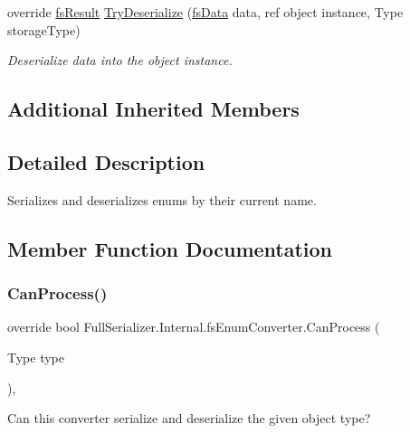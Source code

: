 \begin{DoxyCompactItemize}
override \hyperlink{struct_full_serializer_1_1fs_result}{fs\+Result} \hyperlink{class_full_serializer_1_1_internal_1_1fs_enum_converter_a083b9f0f694869aa476f0e6a333051da}{Try\+Deserialize} (\hyperlink{class_full_serializer_1_1fs_data}{fs\+Data} data, ref object instance, Type storage\+Type)
\begin{DoxyCompactList}\small\item\em Deserialize data into the object instance. \end{DoxyCompactList}\end{DoxyCompactItemize}
\subsection*{Additional Inherited Members}


\subsection{Detailed Description}
Serializes and deserializes enums by their current name. 



\subsection{Member Function Documentation}
\mbox{\label{class_full_serializer_1_1_internal_1_1fs_enum_converter_a93dc5222263e0354440a14a8dac74128}} 
\subsubsection{\texorpdfstring{Can\+Process()}{CanProcess()}}
{\footnotesize\ttfamily override bool Full\+Serializer.\+Internal.\+fs\+Enum\+Converter.\+Can\+Process (\begin{DoxyParamCaption}\item[{Type}]{type }\end{DoxyParamCaption})\hspace{0.3cm}{\ttfamily [inline]}, {\ttfamily [virtual]}}



Can this converter serialize and deserialize the given object type? 


